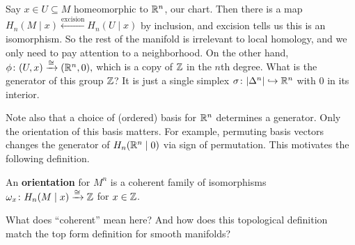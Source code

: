 Say $x \in U \subseteq M$ homeomorphic to $\mathbb{R}^n $, our chart. Then there is a map $H_n (M \mid x) \xleftarrow{ \text{excision} } H_n (U \mid x)$ by inclusion, and excision tells us this is an isomorphism. So the rest of the manifold is irrelevant to local homology, and we only need to pay attention to a neighborhood. On the other hand, $\phi \colon (U,x) \xrightarrow{\cong} (\mathbb{R}^n ,0) ,$ which is a copy of $\mathbb{Z}$ in the $n$th degree. What is the generator of this group $\mathbb{Z}$? It is just a single simplex $\sigma \colon |\Delta ^n | \hookrightarrow \mathbb{R}^n  $ with 0 in its interior. 

Note also that a choice of (ordered) basis for $\mathbb{R}^n $ determines a generator. Only the orientation of this basis matters. For example, permuting basis vectors changes the generator of $H_n (\mathbb{R}^n  \mid 0)$ via sign of permutation. This motivates the following definition.
\begin{definition}[]
    An \textbf{orientation} for $M^n $ is a coherent family of isomorphisms $\omega_x \colon H_n (M \mid x) \xrightarrow{\cong} \mathbb{Z}  $ for $x \in \mathbb{Z}$.
\end{definition}
What does ``coherent'' mean here? And how does this topological definition match the top form definition for smooth manifolds?

